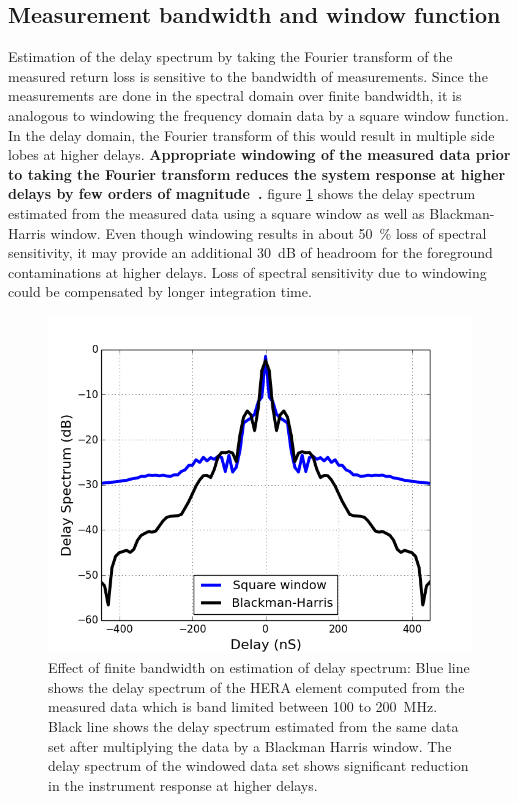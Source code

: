 \documentclass[twocolumn]{emulateapj}
\begin{document}
    \subsection{Measurement bandwidth and window function}
    
    Estimation of the delay spectrum by taking the Fourier transform of the
    measured return loss is sensitive to the bandwidth of measurements. Since the
    measurements are done in the spectral domain over finite bandwidth, it is analogous
     to windowing the frequency domain data by a square
    window function. In the delay domain, the Fourier transform of this would result in
    multiple side lobes at higher delays. \textbf{Appropriate windowing of the
    measured data prior to taking the Fourier transform reduces
    the system response at higher delays by few orders of magnitude~\citep{nithya_et_al2013, Thyagarajan_et_al2016}.}
    figure \ref{fig:window} shows the delay spectrum estimated from the measured
    data using a square window as well as Blackman-Harris window. Even though windowing 
    results in about 50~$\%$ loss of spectral sensitivity, it may provide an additional 30~dB of headroom 
    for the foreground contaminations at higher delays. Loss of spectral sensitivity due to windowing could be compensated by longer integration
    time.     
    \begin{figure}
    \centering
    \includegraphics[width=\linewidth]{GB_reflectometry_part3/plot/ds_window.png}
    \caption{Effect of finite bandwidth on estimation of delay spectrum: Blue line shows the delay spectrum of the HERA element computed from the measured data which is band limited between 100 to 200~MHz. Black line shows the delay spectrum estimated from the same data set after multiplying the data by a Blackman Harris window. The delay spectrum of the windowed data set shows significant reduction in the instrument response at higher delays.}
    \label{fig:window}
    \end{figure} 
    
\end{document}
